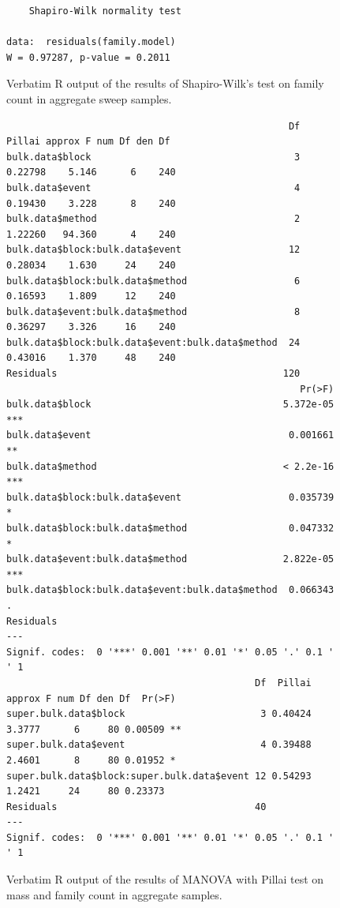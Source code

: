 \documentclass[10pt,letterpaper,twocolumn]{article}
\begin{document}
\begin{figure}[h]
	\lstset{numbers=left}
	\lstset{xleftmargin=5mm,framexleftmargin=5mm}
	\begin{lstlisting}
	Shapiro-Wilk normality test

data:  residuals(family.model)
W = 0.97287, p-value = 0.2011
	\end{lstlisting}
	\caption{Verbatim R output of the results of Shapiro-Wilk's test on family count in aggregate sweep samples.}
	\label{fig:bulk_sweep_family_shapiro}
	\smallskip
	\nointerlineskip
	\hrulefill
\end{figure}

\begin{figure}[h]
	\lstset{numbers=left}
	\lstset{xleftmargin=5mm,framexleftmargin=5mm}
	\begin{lstlisting}
                                                  Df  Pillai approx F num Df den Df
bulk.data$block                                    3 0.22798    5.146      6    240
bulk.data$event                                    4 0.19430    3.228      8    240
bulk.data$method                                   2 1.22260   94.360      4    240
bulk.data$block:bulk.data$event                   12 0.28034    1.630     24    240
bulk.data$block:bulk.data$method                   6 0.16593    1.809     12    240
bulk.data$event:bulk.data$method                   8 0.36297    3.326     16    240
bulk.data$block:bulk.data$event:bulk.data$method  24 0.43016    1.370     48    240
Residuals                                        120                               
                                                    Pr(>F)    
bulk.data$block                                  5.372e-05 ***
bulk.data$event                                   0.001661 ** 
bulk.data$method                                 < 2.2e-16 ***
bulk.data$block:bulk.data$event                   0.035739 *  
bulk.data$block:bulk.data$method                  0.047332 *  
bulk.data$event:bulk.data$method                 2.822e-05 ***
bulk.data$block:bulk.data$event:bulk.data$method  0.066343 .  
Residuals                                                     
---
Signif. codes:  0 '***' 0.001 '**' 0.01 '*' 0.05 '.' 0.1 ' ' 1
                                            Df  Pillai approx F num Df den Df  Pr(>F)   
super.bulk.data$block                        3 0.40424   3.3777      6     80 0.00509 **
super.bulk.data$event                        4 0.39488   2.4601      8     80 0.01952 * 
super.bulk.data$block:super.bulk.data$event 12 0.54293   1.2421     24     80 0.23373   
Residuals                                   40                                          
---
Signif. codes:  0 '***' 0.001 '**' 0.01 '*' 0.05 '.' 0.1 ' ' 1
	\end{lstlisting}
	\caption{Verbatim R output of the results of MANOVA with Pillai test on mass and family count in aggregate samples.}
	\label{fig:MANOVA_Pillai}
	\smallskip
	\nointerlineskip
	\hrulefill
\end{figure}
\end{document}

